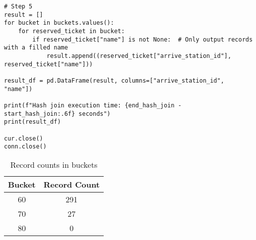 \documentclass{article}
\begin{document}
\begin{verbatim}
# Step 5
result = []
for bucket in buckets.values():
    for reserved_ticket in bucket:
        if reserved_ticket["name"] is not None:  # Only output records with a filled name
            result.append((reserved_ticket["arrive_station_id"], reserved_ticket["name"]))

result_df = pd.DataFrame(result, columns=["arrive_station_id", "name"])

print(f"Hash join execution time: {end_hash_join - start_hash_join:.6f} seconds")
print(result_df)

cur.close()
conn.close()
\end{verbatim}

\begin{table}[H]
    \centering
    \begin{tabular}{cc}
    \toprule
    \textbf{Bucket} & \textbf{Record Count} \\
    \midrule
    60 & 291 \\
    70 & 27 \\
    80 & 0 \\
    \bottomrule
    \end{tabular}
    \caption{Record counts in buckets}
    \label{tab:6_a_bucket_counts}
\end{table}
\end{document}
